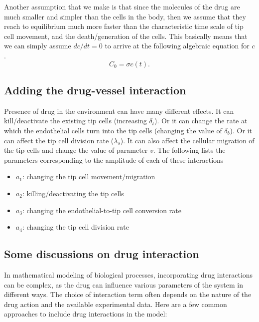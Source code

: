 Another assumption that we make is that since the molecules of the drug are much smaller and simpler than the cells in the body, then we assume that they reach to equilibrium much more faster than the characteristic time scale of tip cell movement, and the death/generation of the cells. This basically means that we can simply assume $dc/dt=0$ to arrive at the following algebraic equation for $c$.
\[ C_0 = \sigma c(t). \]

\subsection*{Adding the drug-vessel interaction}
Presence of drug in the environment can have many different effects. It can kill/deactivate the existing tip cells (increasing $\delta_t$). Or it can change the rate at which the endothelial cells turn into the tip cells (changing the value of $\delta_b$). Or it can affect the tip cell division rate ($\lambda_s$). It can also affect the cellular migration of the tip cells and change the value of parameter $v$. The following lists the parameters corresponding to the amplitude of each of these interactions
\begin{itemize}
	\item $a_1$: changing the tip cell movement/migration
	\item $a_2$: killing/deactivating the tip cells
	\item $a_3$: changing the endothelial-to-tip cell conversion rate
	\item $a_4$: changing the tip cell division rate
\end{itemize}


\subsection*{Some discussions on drug interaction}
In mathematical modeling of biological processes, incorporating drug interactions can be complex, as the drug can influence various parameters of the system in different ways. The choice of interaction term often depends on the nature of the drug action and the available experimental data.
Here are a few common approaches to include drug interactions in the model:

